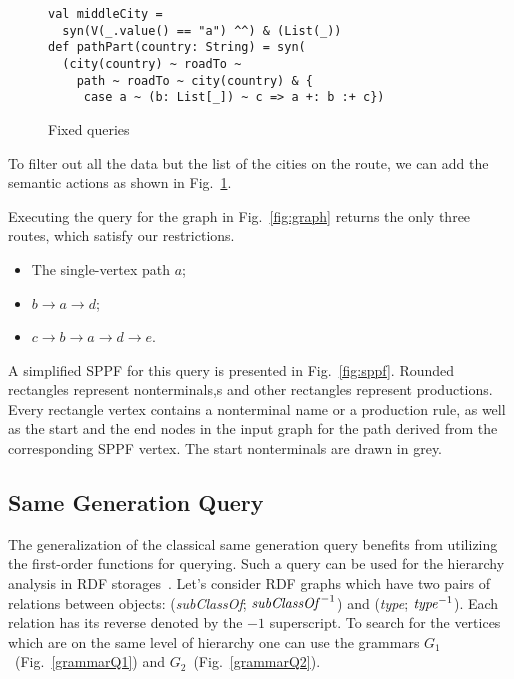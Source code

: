 \begin{figure}[h]
\begin{lstlisting}
val middleCity =
  syn(V(_.value() == "a") ^^) & (List(_))
def pathPart(country: String) = syn(
  (city(country) ~ roadTo ~
    path ~ roadTo ~ city(country) & {
     case a ~ (b: List[_]) ~ c => a +: b :+ c})
\end{lstlisting}
\caption{Fixed queries}
\label{fig:fixedPathQ}
\end{figure}

To filter out all the data but the list of the cities on the route, we can add the semantic actions as shown in Fig.~\ref{fig:fixedPathQ}.


Executing the query for the graph in Fig.~\ref{fig:graph} returns the only three routes, which satisfy our restrictions.

\begin{itemize}
\item The single-vertex path $a$;
\item $b \rightarrow a \rightarrow d$;
\item $c \rightarrow b \rightarrow a \rightarrow d \rightarrow e$.
\end{itemize}

A simplified SPPF for this query is presented in Fig.~\ref{fig:sppf}. Rounded rectangles represent nonterminals,s and other rectangles represent productions.
Every rectangle vertex contains a nonterminal name or a production rule, as well as the start and the end nodes in the input graph for the path derived from the corresponding SPPF vertex.
The start nonterminals are drawn in grey.

\subsection{Same Generation Query}

The generalization of the classical same generation query benefits from utilizing the first-order functions for querying.
Such a query can be used for the hierarchy analysis in RDF storages~\cite{CFGonRDF}.
Let's consider RDF graphs which have two pairs of relations between objects: (\emph{subClassOf}; $\text{\emph{subClassOf}}^{-1}$) and (\emph{type}; $\text{\emph{type}}^{-1}$). Each relation has its reverse denoted by the $-1$ superscript.
To search for the vertices which are on the same level of hierarchy one can use the grammars $G_1$~(Fig.~\ref{grammarQ1}) and $G_2$~(Fig.~\ref{grammarQ2}).


